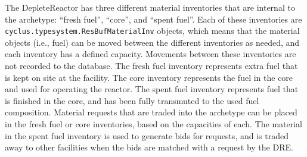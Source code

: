 The DepleteReactor has three different material inventories that 
are internal to the archetype: ``fresh fuel'', ``core'', and ``spent 
fuel''. Each of these inventories are 
\texttt{cyclus.typesystem.ResBufMaterialInv} objects, which means that 
the material objects (i.e., fuel) can be moved between the different 
inventories as needed, and each inventory has a defined capacity. Movements 
between these inventories are not recorded to the database. The fresh 
fuel inventory represents extra fuel that is kept on site at the 
facility. The core inventory represents the fuel in the core 
and used for operating the reactor. The spent fuel inventory 
represents fuel that is finished in the core, and has been fully 
transmuted to the used fuel composition. Material requests that 
are traded into the archetype can be placed in the fresh fuel 
or core inventories, based on the capacities of each. The 
material in the spent fuel inventory is used to generate bids 
for requests, and is traded away to other facilities when the bids 
are matched with a request by the \gls{DRE}. 

